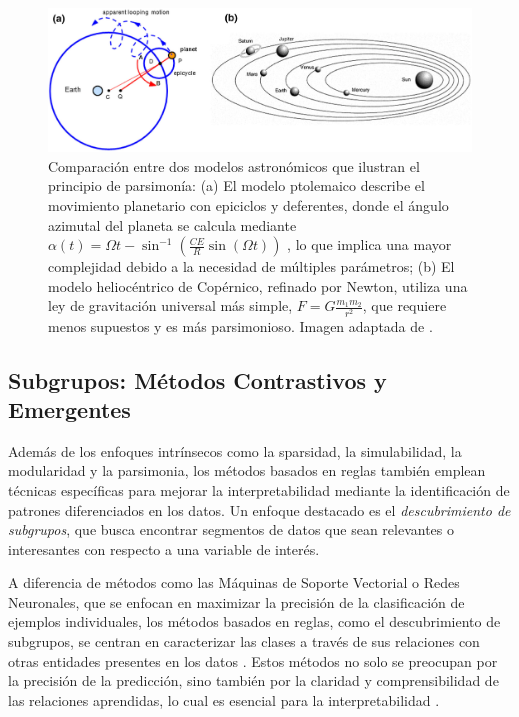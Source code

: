 \begin{figure}[H]
    \centering
    \includegraphics[width=1\textwidth]{include/solar.PNG}
    \caption{Comparación entre dos modelos astronómicos que ilustran el principio de parsimonía: (a) El modelo ptolemaico describe el movimiento planetario con epiciclos y deferentes, donde el ángulo azimutal del planeta se calcula mediante \(\alpha(t) = \Omega t - \sin^{-1} \left( \frac{CE}{R} \sin(\Omega t) \right)\) \cite{rushkin2015optimizing}, lo que implica una mayor complejidad debido a la necesidad de múltiples parámetros; (b) El modelo heliocéntrico de Copérnico, refinado por Newton, utiliza una ley de gravitación universal más simple, \( F = G \frac{m_1 m_2}{r^2} \), que requiere menos supuestos y es más parsimonioso. Imagen adaptada de \cite{kutz2022parsimony}.}
    \label{fig:parsimonia}
\end{figure}

\subsection{Subgrupos: Métodos Contrastivos y Emergentes}

Además de los enfoques intrínsecos como la sparsidad, la simulabilidad, la modularidad y la parsimonia, los métodos basados en reglas también emplean técnicas específicas para mejorar la interpretabilidad mediante la identificación de patrones diferenciados en los datos. Un enfoque destacado es el \textit{descubrimiento de subgrupos}, que busca encontrar segmentos de datos que sean relevantes o interesantes con respecto a una variable de interés.

A diferencia de métodos como las Máquinas de Soporte Vectorial o Redes Neuronales, que se enfocan en maximizar la precisión de la clasificación de ejemplos individuales, los métodos basados en reglas, como el descubrimiento de subgrupos, se centran en caracterizar las clases a través de sus relaciones con otras entidades presentes en los datos \cite{duda-2000}. Estos métodos no solo se preocupan por la precisión de la predicción, sino también por la claridad y comprensibilidad de las relaciones aprendidas, lo cual es esencial para la interpretabilidad \cite{Herrera-2010}.


